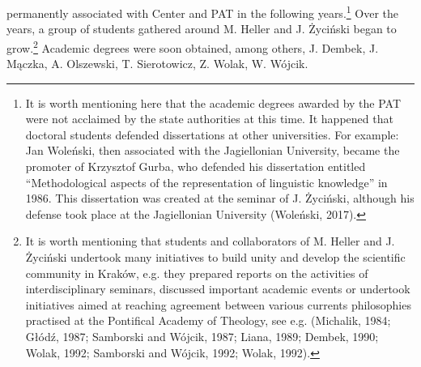 \documentclass[a4paper]{article}
\begin{document}
permanently associated with Center and PAT in the following years.\footnote{ It is worth mentioning here that the
academic degrees awarded by the PAT were not acclaimed by the state authorities at this time. It happened that doctoral
students defended dissertations at other universities. For example: Jan Woleński, then associated with the Jagiellonian
University, became the promoter of Krzysztof Gurba, who defended his dissertation entitled “Methodological aspects of
the representation of linguistic knowledge” in 1986. This dissertation was created at the seminar of J. Życiński,
although his defense took place at the Jagiellonian University \label{ref:RNDFdEunmKTKD}(Woleński, 2017).} Over the
years, a group of students gathered around M. Heller and J. Życiński began to grow.\footnote{ It is worth mentioning
that students and collaborators of M. Heller and J. Życiński undertook many initiatives to build unity and develop the
scientific community in Kraków, e.g. they prepared reports on the activities of interdisciplinary seminars, discussed
important academic events or undertook initiatives aimed at reaching agreement between various currents philosophies
practised at the Pontifical Academy of Theology, see e.g. \label{ref:RNDV2Ic4V5oZj}(Michalik, 1984; Głódź, 1987;
Samborski and Wójcik, 1987; Liana, 1989; Dembek, 1990; Wolak, 1992; Samborski and Wójcik, 1992; Wolak, 1992).} Academic
degrees were soon obtained, among others, J. Dembek, J. Mączka, A. Olszewski, T. Sierotowicz, Z. Wolak, W. Wójcik.
\end{document}
